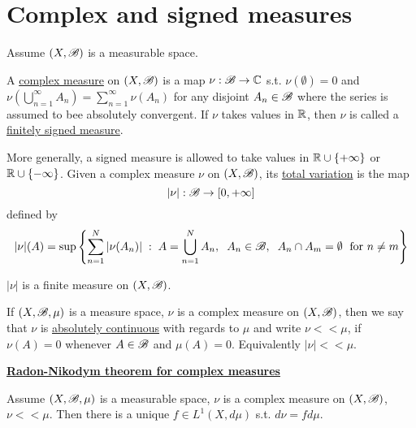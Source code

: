 \section{Complex and signed measures}
Assume $(X,\mathscr{B})$ is a measurable space. 
\begin{definition}
    A \underline{complex measure} on $(X,\mathscr{B})$ is a map $\nu:\mathscr{B}\rightarrow \mathbb{C}$ s.t. $\nu(\emptyset)=0$ and $\nu(\bigcup_{n=1}^\infty A_n) = \sum_{n=1}^{\infty}\nu(A_n)$
    for any disjoint $A_n\in\mathscr{B}$ where the series is assumed to bee absolutely convergent. If $\nu$ takes values in $\mathbb{R}$, then $\nu$ is called a \underline{finitely signed measure}.
\end{definition}

\begin{remark}
    More generally, a signed measure is allowed to take values in $\mathbb{R}\cup\{+\infty\}$ or $\mathbb{R}\cup\{-\infty\}$. Given a complex measure $\nu$ on $(X,\mathscr{B} )$, its 
    \underline{total variation} is the map $$|\nu|:\mathscr{B}\rightarrow [0,+\infty]$$
    defined by $$|\nu|(A) = \sup\left\{ \sum_{n=1}^{N}|\nu(A_n)|\hspace{1mm}:\hspace{1mm} A=\bigcup_{n=1}^N A_n,\hspace{2mm} A_n\in\mathscr{B},\hspace{2mm} A_n\cap A_m=\emptyset \hspace{1mm} \text{  for }n\neq m \right\}$$
\end{remark}

\begin{proposition}
    $|\nu|$ is a finite measure on $(X,\mathscr{B})$.
\end{proposition}

\begin{definition}
    If $(X,\mathscr{B},\mu)$ is a measure space, $\nu$ is a complex measure on $(X,\mathscr{B})$, then we say that $\nu$ is \underline{absolutely continuous} with regards to $\mu$
    and write $\nu<<\mu$, if $\nu(A)=0$ whenever $A\in\mathscr{B}$ and $\mu(A)=0$. Equivalently $|\nu|<<\mu$.
\end{definition}

\begin{theorem}\underline{\textbf{Radon-Nikodym theorem for complex measures}}

    Assume $(X,\mathscr{B},\mu)$ is a measurable space, $\nu$ is a complex measure on $(X,\mathscr{B})$, $\nu<<\mu$. Then there 
    is a unique $f\in L^1(X,d\mu)$ s.t. $d\nu = fd\mu$.
\end{theorem}
